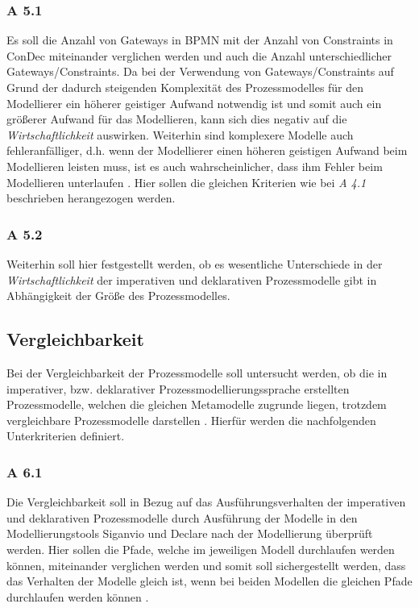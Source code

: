 \subsubsection{A 5.1}
Es soll die Anzahl von Gateways in BPMN mit der Anzahl von Constraints in ConDec miteinander verglichen werden und auch die Anzahl unterschiedlicher Gateways/Constraints. Da bei der Verwendung von Gateways/Constraints auf Grund der dadurch steigenden Komplexität des Prozessmodelles für den Modellierer ein höherer geistiger Aufwand notwendig ist und somit auch ein größerer Aufwand für das Modellieren, kann sich dies negativ auf die \textit{Wirtschaftlichkeit} auswirken. Weiterhin sind komplexere Modelle auch fehleranfälliger, d.h. wenn der Modellierer einen höheren geistigen Aufwand beim Modellieren leisten muss, ist es auch wahrscheinlicher, dass ihm Fehler beim Modellieren unterlaufen \cite{freund2007, journals95, leimeister2012,mendling2010seven}.
Hier sollen die gleichen Kriterien wie bei \textit{A 4.1} beschrieben herangezogen werden.

\subsubsection{A 5.2}
Weiterhin soll hier festgestellt werden, ob es wesentliche Unterschiede in der \textit{Wirtschaftlichkeit} der imperativen und deklarativen Prozessmodelle gibt in Abhängigkeit der Größe des Prozessmodelles. 

\subsection{Vergleichbarkeit}
Bei der Vergleichbarkeit der Prozessmodelle soll untersucht werden, ob die in imperativer, bzw. deklarativer Prozessmodellierungssprache erstellten Prozessmodelle, welchen die gleichen Metamodelle zugrunde liegen, trotzdem vergleichbare Prozessmodelle darstellen \cite{freund2007, journals95, leimeister2012}. Hierfür werden die nachfolgenden Unterkriterien definiert.

\subsubsection{A 6.1}
Die Vergleichbarkeit soll in Bezug auf das Ausführungsverhalten der imperativen und deklarativen Prozessmodelle durch Ausführung der Modelle in den Modellierungstools Siganvio und Declare nach der Modellierung überprüft werden. Hier sollen die Pfade, welche im jeweiligen Modell durchlaufen werden können, miteinander verglichen werden und somit soll sichergestellt werden, dass das Verhalten der Modelle gleich ist, wenn bei beiden Modellen die gleichen Pfade durchlaufen werden können \cite{haisjackl2014understanding}.

